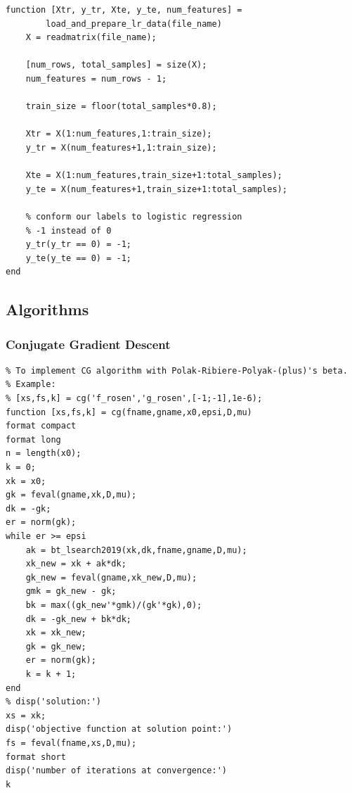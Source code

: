 \documentclass[12pt,conference]{IEEEtran}
\begin{document}
\begin{appendices}
\begin{verbatim}
function [Xtr, y_tr, Xte, y_te, num_features] = 
        load_and_prepare_lr_data(file_name)
    X = readmatrix(file_name);

    [num_rows, total_samples] = size(X);
    num_features = num_rows - 1;

    train_size = floor(total_samples*0.8);

    Xtr = X(1:num_features,1:train_size);
    y_tr = X(num_features+1,1:train_size);

    Xte = X(1:num_features,train_size+1:total_samples);
    y_te = X(num_features+1,train_size+1:total_samples);

    % conform our labels to logistic regression
    % -1 instead of 0
    y_tr(y_tr == 0) = -1;
    y_te(y_te == 0) = -1;
end
\end{verbatim}

\subsection{Algorithms}
\subsubsection{Conjugate Gradient Descent}
\label{AppendixB-CG}
\begin{verbatim}
% To implement CG algorithm with Polak-Ribiere-Polyak-(plus)'s beta.
% Example:
% [xs,fs,k] = cg('f_rosen','g_rosen',[-1;-1],1e-6);
function [xs,fs,k] = cg(fname,gname,x0,epsi,D,mu)
format compact
format long
n = length(x0);
k = 0;
xk = x0;
gk = feval(gname,xk,D,mu);
dk = -gk;
er = norm(gk);
while er >= epsi
    ak = bt_lsearch2019(xk,dk,fname,gname,D,mu);
    xk_new = xk + ak*dk;  
    gk_new = feval(gname,xk_new,D,mu);
    gmk = gk_new - gk;
    bk = max((gk_new'*gmk)/(gk'*gk),0);
    dk = -gk_new + bk*dk;
    xk = xk_new;
    gk = gk_new;
    er = norm(gk);
    k = k + 1;
end
% disp('solution:')
xs = xk;
disp('objective function at solution point:')
fs = feval(fname,xs,D,mu);
format short
disp('number of iterations at convergence:')
k
\end{verbatim}


\end{appendices}
\end{document}
